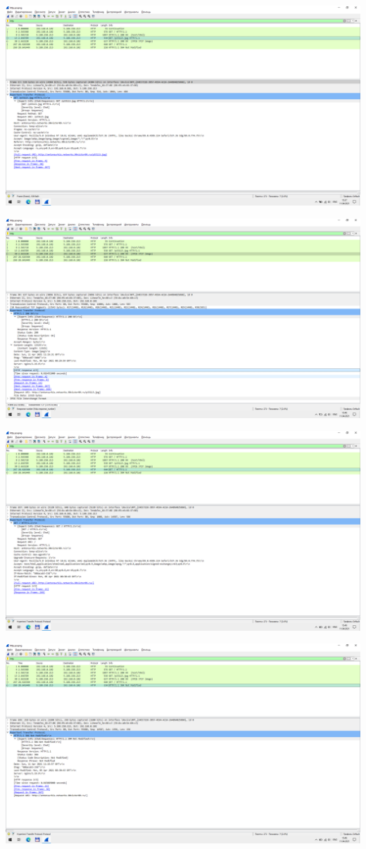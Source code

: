 \begin{center}
    \includegraphics[width=\textwidth]{screenshots/http_get_jpg_request_1}

    \includegraphics[width=\textwidth]{screenshots/http_get_jpg_response_1}

    \includegraphics[width=\textwidth]{screenshots/http_get_cached_request_1}

    \includegraphics[width=\textwidth]{screenshots/http_get_cached_response_1}


\end{center}
